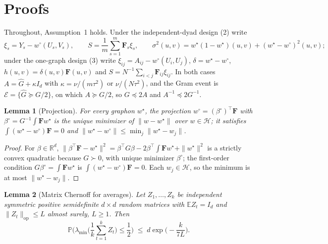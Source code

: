 \documentclass[12pt]{article}
\newcommand{\R}{\mathbb{R}}
\newcommand{\E}{\mathbb{E}}
\newcommand{\Prob}{\mathbb{P}}
\newcommand{\calH}{\mathcal{H}}
\newcommand{\norm}[1]{\|#1\|}
\newcommand{\wstar}{w^{\star}}
\newcommand{\wproj}{w^{\circ}}
\newcommand{\bproj}{\beta^{\circ}}
\newcommand{\Ghat}{\hat G}
\newcommand{\Fv}{\mathbf{F}}
\newtheorem{lemma}{Lemma}
\begin{document}
\section{Proofs}
\label{sec:proofs}

Throughout, Assumption~1 holds. Under the independent-dyad design (2) write
\[
\xi_s=Y_s-\wproj(U_s,V_s),\qquad S=\frac1m\sum_{s=1}^m\Fv_s\xi_s,\qquad \sigma^2(u,v)=\wstar(1-\wstar)(u,v)+(\wstar-\wproj)^2(u,v);
\]
under the one-graph design (3) write $\xi_{ij}=A_{ij}-\wproj(U_i,U_j)$, $\delta=\wstar-\wproj$, $h(u,v)=\delta(u,v)\Fv(u,v)$ and $S=N^{-1}\sum_{i<j}\Fv_{ij}\xi_{ij}$. In both cases $A=\Ghat+\kappa I_d$ with $\kappa=\nu/(m\tau^2)$ or $\nu/(N\tau^2)$, and the Gram event is $\mathcal{E}=\{\Ghat\succeq G/2\}$, on which $A\succeq G/2$, so $G\preceq2A$ and $A^{-1}\preceq2G^{-1}$.

\begin{lemma}[Projection]
\label{lem:proj}
For every graphon $\wstar$, the projection $\wproj=(\bproj)^{\top}\Fv$ with $\bproj=G^{-1}\int\Fv\wstar$ is the unique minimizer of $\norm{w-\wstar}$ over $w\in\calH$; it satisfies $\int(\wstar-\wproj)\Fv=0$ and $\norm{\wstar-\wproj}\le\min_j\norm{\wstar-w_j}$.
\end{lemma}

\begin{proof}
For $\beta\in\R^d$, $\norm{\beta^{\top}\Fv-\wstar}^2=\beta^{\top}G\beta-2\beta^{\top}\int\Fv\wstar+\norm{\wstar}^2$ is a strictly convex quadratic because $G\succ0$, with unique minimizer $\bproj$; the first-order condition $G\bproj=\int\Fv\wstar$ is $\int(\wstar-\wproj)\Fv=0$. Each $w_j\in\calH$, so the minimum is at most $\norm{\wstar-w_j}$.
\end{proof}

\begin{lemma}[Matrix Chernoff for averages]
\label{lem:chernoff}
Let $Z_1,\dots,Z_k$ be independent symmetric positive semidefinite $d\times d$ random matrices with $\E Z_t=I_d$ and $\norm{Z_t}_{\mathrm{op}}\le L$ almost surely, $L\ge1$. Then
\[
\Prob\Big(\lambda_{\min}\Big(\frac1k\sum_{t=1}^{k}Z_t\Big)\le\frac12\Big)\;\le\;d\exp\Big(-\frac{k}{7L}\Big).
\]
\end{lemma}
\end{document}
